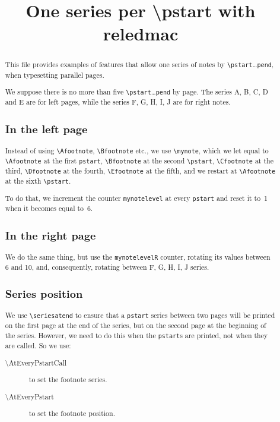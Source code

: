 \documentclass{article}
\newcounter{mynotelevel}%
\newcounter{mynotelevelR}%
\begin{document}
\title{One series per \textbackslash pstart with reledmac}
\author{}
\maketitle
\begin{abstract}
This file provides examples of features that allow one series of notes by \verb+\pstart+…\verb+pend+, when typesetting parallel pages.

We suppose there is no more than five \verb+\pstart+…\verb+pend+ by page. The series A, B, C, D and E are for left pages, while the series F, G, H, I, J are for right notes.

\subsection*{In the left page}
Instead of using \verb+\Afootnote+, \verb+\Bfootnote+ etc., we use \verb+\mynote+, which we let equal to \verb+\Afootnote+ at the first \verb+pstart+, \verb+\Bfootnote+ at the second \verb+\pstart+, \verb+\Cfootnote+ at the third, \verb+\Dfootnote+ at the fourth, \verb+\Efootnote+ at the fifth, and we restart at \verb+\Afootnote+ at the sixth \verb+\pstart+.

To do that, we increment the counter \verb+mynotelevel+ at every \verb+pstart+ and reset it to~1 when it becomes equal to~6.



\subsection*{In the right page}

We do the same thing, but use the \verb+mynotelevelR+ counter, rotating its values between 6 and 10, and, consequently, rotating between F, G, H, I, J series.

\subsection*{Series position}
We use \verb+\seriesatend+ to ensure that a \verb+pstart+ series between two pages will be printed on the first page at the end of the series, but on the second page at the beginning of the series.
However, we need to do this when the \verb+pstart+s are printed, not when they are called. So we use:
\begin{description}
  \item[\textbackslash AtEveryPstartCall] to set the footnote series.
  \item[\textbackslash AtEveryPstart] to set the footnote position.
\end{description}
\end{abstract}
\end{document}
